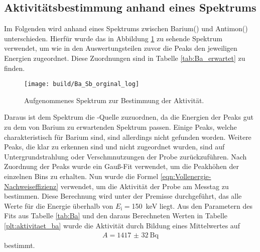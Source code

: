 \subsection{Aktivitätsbestimmung anhand eines Spektrums}
\label{sec:Aktivitätsbestimmung}
Im Folgenden wird anhand eines Spektrums zwischen Barium() und Antimon()
unterschieden. Hierfür wurde das in Abbildung \ref{plt:bar} zu sehende
Spektrum verwendet, um wie in den Auswertungsteilen zuvor die Peaks den jeweiligen
Energien zugeordnet. Diese Zuordnungen sind in Tabelle \ref{tab:Ba_erwartet} zu
finden.
\begin{figure}[htb]
  \centering
  \texttt{[image: build/Ba\_Sb\_orginal\_log]}
  \caption{Aufgenommenes Spektrum zur Bestimmung der Aktivität.}
  \label{plt:bar}
\end{figure}

\FloatBarrier
Daraus ist dem Spektrum die -Quelle zuzuordnen, da die Energien der
Peaks gut zu dem von Barium zu erwartenden Spektrum passen. Einige Peaks, welche
charakteristisch für Barium sind, sind allerdings nicht gefunden worden.
Weitere Peaks, die klar zu erkennen sind und nicht zugeordnet wurden, sind auf
Untergrundstrahlung oder Verschmnutzungen der Probe zurückzuführen. Nach
Zuordnung der Peaks wurde ein Gauß-Fit verwendet, um die Peakhöhen der einzelnen
Bins zu erhalten. Nun wurde die Formel \eqref{eqn:Vollenergie-Nachweiseffizienz}
verwendet, um die Aktivität der Probe am Messtag zu bestimmen. Diese Berechnung
wird unter der Premisse durchgeführt, das alle Werte für die Energie überhalb
von $E_\text{i} = $\SI{150}{\kilo\electronvolt} liegt. Aus den Parametern des
Fits aus Tabelle \ref{tab:Ba} und den daraus Berechneten Werten in Tabelle
\ref{plt:aktivitaet_ba} wurde die Aktivität durch Bildung eines Mittelwertes
auf
\begin{align*}
  A = \SI{1417(32)}{\becquerel}
\end{align*}
bestimmt.


\FloatBarrier

